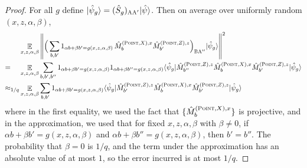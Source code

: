 \documentclass[11pt]{article}
\theoremstyle{definition}
\newcommand{\ket}[1]{|#1\rangle}
\newcommand{\bra}[1]{\langle#1|}
\newcommand{\norm}[1]{\left\| {#1} \right\|}
\newcommand{\E}{\mathop{\mathbb{E}}\displaylimits}
\newcommand{\labelstyle}[1]{\ensuremath{\textsc{#1}}\xspace}
\newcommand{\alice}{\labelstyle{A}}
\newcommand{\bob}{\labelstyle{B}}
\newcommand{\typestyle}[1]{\ensuremath{\textsc{#1}}\xspace}
\newcommand{\Point}{\typestyle{Point}}
\begin{document}
\begin{proof}
	For all $g$ define $ \ket{\hat{\psi}_g} =(\hat{S}_g)_{\alice \alice'} \ket{\hat{\psi}}$. 
	Then on average over uniformly random $(x,z,\alpha,\beta)$, 
	  \begin{align}
	  	&\E_{x,z,\alpha,\beta} \norm{ \Big ( \sum_{b,b'} 1_{\alpha b + \beta b' = g(x,z,\alpha,\beta)} \, \hat{M}^{(\Point,X),x}_{b} \hat{M}^{(\Point,Z),z}_{b'} \Big)_{\bob \alice''} \ket{\hat{\psi}_g} }^2\notag \\
		=_{\phantom{1/q}}& \E_{x,z,\alpha,\beta} \sum_{b,b',b''} 1_{\alpha b + \beta b' = g(x,z,\alpha,\beta)} 1_{\alpha b + \beta b'' = g(x,z,\alpha,\beta)} \bra{\hat{\psi}_g}  \hat{M}^{(\Point,Z),z}_{b''} \hat{M}^{(\Point,X),x}_{b} \hat{M}^{(\Point,Z),z}_{b'} \ket{\hat{\psi}_g} \notag\\
		\approx_{1/q}& \E_{x,z,\alpha,\beta} \sum_{b,b'} 1_{\alpha b + \beta b' = g(x,z,\alpha,\beta)} \bra{\hat{\psi}_g}  \hat{M}^{(\Point,Z),z}_{b'} \hat{M}^{(\Point,X),x}_{b} \hat{M}^{(\Point,Z),z}_{b'} \ket{\hat{\psi}_g}
		\label{eq:qld-g-prime}
	  \end{align}
	  where in the first equality, we used the fact that $ \{  \hat{M}^{(\Point,X),x}_{b} \}$ is projective, and in the approximation, we used that for fixed $x,z,\alpha,\beta$ with $\beta \neq 0$, if $\alpha b + \beta b' = g(x,z,\alpha,\beta)$ and $\alpha b + \beta b'' = g(x,z,\alpha,\beta)$, then $b' = b''$. The probability that $\beta = 0$ is $1/q$, and the term under the approximation has an absolute value of at most $1$, so the error incurred is at most $1/q$.


\end{proof}
\end{document}
